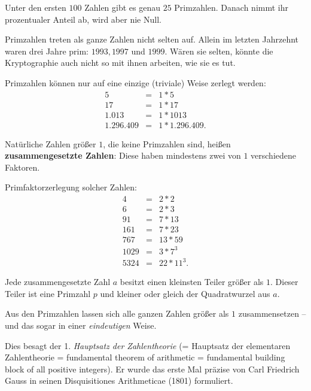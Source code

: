 \begin{refsegment}
Unter den ersten $100$ Zahlen gibt es genau $25$ Primzahlen. Danach nimmt ihr
prozentualer Anteil ab, wird aber nie Null.

Primzahlen treten als ganze Zahlen nicht selten auf. Allein im letzten
Jahrzehnt waren drei Jahre prim: $1993, 1997$ und $1999$. Wären sie selten,
könnte die Kryptographie auch nicht so mit ihnen arbeiten, wie sie es tut.

Primzahlen können nur auf eine einzige (\glqq triviale\grqq) Weise zerlegt werden:
\begin{eqnarray*}
5 & = & 1 * 5 \nonumber\\
17 & =  & 1 * 17 \nonumber\\
1.013 &  = & 1 * 1013 \nonumber\\
1.296.409 & = & 1 * 1.296.409. \nonumber
\end{eqnarray*}

\begin{definition}\label{def-zth-composite}
Natürliche Zahlen größer $1$, die keine Primzahlen sind, heißen
{\bf zusammengesetzte Zahlen}: Diese haben mindestens zwei von $1$ verschiedene
Faktoren.
\end{definition}


\begin{example}{ Primfaktorzerlegung solcher Zahlen:}
\begin{eqnarray*}
4 & = & 2*2  \nonumber\\
6 & = & 2*3  \nonumber\\
91 & = & 7*13  \nonumber\\
161 & = & 7*23  \nonumber\\
767 & = & 13*59  \nonumber\\
1029 & = & 3 * 7^3  \nonumber\\
5324 & = & 22 * 11^3.  \nonumber
\end{eqnarray*}

\begin{satz}\label{thm-zth-cnum}
Jede zusammengesetzte Zahl $a$ besitzt einen kleinsten Teiler größer
als $1$. Dieser Teiler ist eine Primzahl $p$ und kleiner oder gleich der Quadratwurzel
aus $a$.
\end{satz}
\end{example}
Aus den Primzahlen lassen sich alle ganzen Zahlen größer als $1$
zusammensetzen -- und das sogar in einer {\em eindeutigen} Weise.

Dies besagt  der 1. {\em Hauptsatz der Zahlentheorie} (= Hauptsatz der elementaren
Zahlentheorie = fundamental theorem of arithmetic = fundamental building
block of all positive integers). Er wurde das erste Mal präzise von Carl
Friedrich Gauss in seinen Disquisitiones Arithmeticae (1801) formuliert.
  


\end{refsegment}
